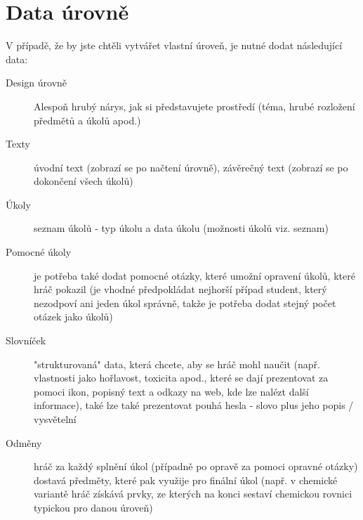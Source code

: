 \documentclass[a4paper,12pt]{article}
\begin{document}
\section{Data úrovně}
V případě, že by jste chtěli vytvářet vlastní úroveň, je nutné dodat následující data:\\
\begin{description}
\item[Design úrovně] Alespoň hrubý nárys, jak si představujete prostředí (téma, hrubé rozložení předmětů a úkolů apod.)
\item[Texty] úvodní text (zobrazí se po načtení úrovně), závěrečný text (zobrazí se po dokončení všech úkolů)
\item[Úkoly] seznam úkolů - typ úkolu a data úkolu (možnosti úkolů viz. seznam)
\item[Pomocné úkoly] je potřeba také dodat pomocné otázky, které umožní opravení úkolů, které hráč pokazil (je vhodné předpokládat nejhorší případ student, který nezodpoví ani jeden úkol správně, takže je potřeba dodat stejný počet otázek jako úkolů)
\item[Slovníček] "strukturovaná" data, která chcete, aby se hráč mohl naučit (např. vlastnosti jako hořlavost, toxicita apod., které se dají prezentovat za pomoci ikon, popisný text a odkazy na web, kde lze nalézt další informace), také lze také prezentovat pouhá hesla - slovo plus jeho popis / vysvětelní
\item[Odměny] hráč za každý splnění úkol (případně po opravě za pomoci opravné otázky) dostavá předměty, které pak využije pro finální úkol (např. v chemické variantě hráč získává prvky, ze kterých na konci sestaví chemickou rovnici typickou pro danou úroveň)
\end{description}
\end{document}
